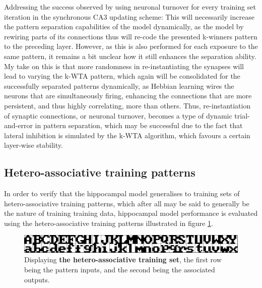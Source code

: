 Addressing the success observed by using neuronal turnover for every training set iteration in the synchronous CA3 updating scheme: 
This will necessarily increase the pattern separation capabilities of the model dynamically, as the model by rewiring parts of its connections thus will re-code the presented k-winners pattern to the preceding layer. However, as this is also performed for each exposure to the same pattern, it remains a bit unclear how it still enhances the separation ability. My take on this is that more randomness in re-instantiating the synapses will lead to varying the k-WTA pattern, which again will be consolidated for the successfully separated patterns dynamically, as Hebbian learning wires the neurons that are simultaneously firing, enhancing the connections that are more persistent, and thus highly correlating, more than others. Thus, re-instantiation of synaptic connections, or neuronal turnover, becomes a type of dynamic trial-and-error in pattern separation, which may be successful due to the fact that lateral inhibition is simulated by the k-WTA algorithm, which favours a certain layer-wise stability.

\subsection{Hetero-associative training patterns}\label{sect:hetero-associative}

In order to verify that the hippocampal model generalises to training sets of hetero-associative training patterns, which after all may be said to generally be the nature of training training data, hippocampal model performance is evaluated using the hetero-associative training patterns illustrated in figure \ref{fig:hetero-associative-patterns}.

\begin{figure}
    \centering
    \includegraphics[width=13cm]{fig/im_both_hetero}
    \caption{Displaying \textbf{the hetero-associative training set}, the first row being the pattern inputs, and the second being the associated outputs.}
    \label{fig:hetero-associative-patterns}
\end{figure}

